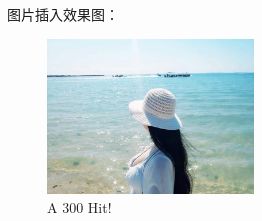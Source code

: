 \documentclass[12pt,a4paper]{article}
\begin{document}
图片插入效果图：

\begin{figure}[htbp]
\centering    %

		\includegraphics[width=155pt]{sea.jpg}

\caption{A 300 Hit!}
\label{fig:300}
\end{figure}





	
\end{document}
